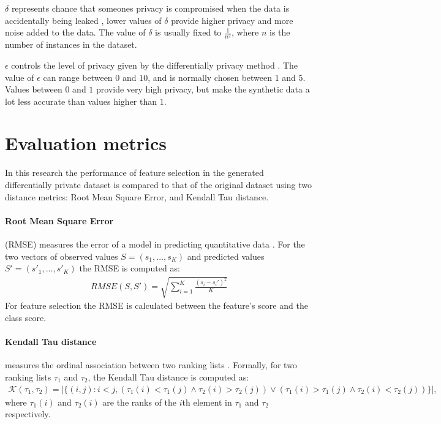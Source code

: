 $\delta$ represents chance that someones privacy is compromised when the data is accidentally being leaked \cite{dpparams}, lower values of $\delta$ provide higher privacy and more noise added to the data. The value of $\delta$ is usually fixed to $\frac{1}{n^2}$, where $n$ is the number of instances in the dataset.

$\epsilon$ controls the level of privacy given by the differentially privacy method \cite{dpparams}. The value of $\epsilon$ can range between $0$ and $10$, and is normally chosen between $1$ and $5$. Values between $0$ and $1$ provide very high privacy, but make the synthetic data a lot less accurate than values higher than $1$.


\section{Evaluation metrics}
In this research the performance of feature selection in the generated differentially private dataset is compared to that of the original dataset using two distance metrics: Root Mean Square Error, and Kendall Tau distance.

\paragraph{Root Mean Square Error}
(RMSE) measures the error of a model in predicting quantitative data \cite{originalpaper}. For the two vectors of observed values $S = (s_{1},...,s_{K})$ and predicted values $S' = (s'_{1},...,s'_{K})$ the RMSE is computed as:
\begin{align}
    RMSE(S,S') = \sqrt{\sum^{K}_{i=1}\frac{(s_{i}-s_{i}')^2}{K}}
\end{align}
For feature selection the RMSE is calculated between the feature's score and the class score.

\paragraph{Kendall Tau distance}
measures the ordinal association between two ranking lists \cite{originalpaper}. Formally, for two ranking lists $\tau_1$ and $\tau_2$, the Kendall Tau distance is computed as:
\begin{align}
    \mathcal{K}(\tau_{1}, \tau_{2}) = |\{(i,j) : i < j, (\tau_{1}(i) < \tau_{1}(j) \wedge \tau_{2}(i) > \tau_{2}(j)) \vee (\tau_{1}(i) > \tau_{1}(j) \wedge \tau_{2}(i) < \tau_{2}(j))\}|,
\end{align}
where $\tau_{1}(i)$ and $\tau_{2}(i)$ are the ranks of the $i$th element in $\tau_{1}$ and $\tau_{2}$ respectively.

